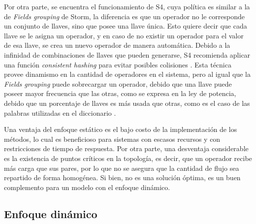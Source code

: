 
Por otra parte, se encuentra el funcionamiento de S4, cuya política es similar a la de \textit{Fields grouping} de Storm, la diferencia es que un operador no le corresponde un conjunto de llaves, sino que posee una llave única. Esto quiere decir que cada llave se le asigna un operador, y en caso de no existir un operador para el valor de esa llave, se crea un nuevo operador de manera automática. Debido a la infinidad de combinaciones de llaves que pueden generarse, S4 recomienda aplicar una función \textit{consistent hashing} para evitar posibles colisiones \citep{X11cp}. Esta técnica provee dinamismo en la cantidad de operadores en el sistema, pero al igual que la \textit{Fields grouping} puede sobrecargar un operador, debido que una llave puede poseer mayor frecuencia que las otras, como se expresa en la ley de potencia, debido que un porcentaje de llaves es más usada que otras, como es el caso de las palabras utilizadas en el diccionario \citep{rushton2010handbook}.

Una ventaja del enfoque estático es el bajo costo de la implementación de los métodos, lo cual es beneficioso para sistemas con escasos recursos y con restricciones de tiempo de respuesta. Por otra parte, una desventaja considerable es la existencia de puntos críticos en la topología, es decir, que un operador recibe más carga que sus pares, por lo que no se asegura que la cantidad de flujo sea repartido de forma homogénea. Si bien, no es una solución óptima, es un buen complemento para un modelo con el enfoque dinámico.

\subsection{Enfoque dinámico}
\label{subsec:enfoqueDinamicoBC}



